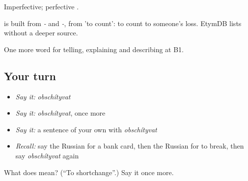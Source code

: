 Imperfective; perfective \emph{}.

\begin{cousinweb}
\emph{} is built from \emph{-} and \emph{-}, from \emph{} 'to count': to count to someone's loss. EtymDB lists \emph{} without a deeper source.
\end{cousinweb}

\begin{grammarlens}[title={What you've built}]
One more word for telling, explaining and describing at B1.
\end{grammarlens}

\subsection*{Your turn}
\begin{itemize}
\raggedright
  \item \emph{Say it:} \emph{obschítyvat}
  \item \emph{Say it:} \emph{obschítyvat}, once more
  \item \emph{Say it:} a sentence of your own with \emph{obschítyvat}
  \item \emph{Recall:} say the Russian for a bank card, then the Russian for to break, then say \emph{obschítyvat} again
\end{itemize}

\begin{tcolorbox}[breakable,colback=teal!4,colframe=teal!35!black,title={Before you move on}]
What does  mean? (\textquotedblleft{}To shortchange\textquotedblright{}.) Say it once more.
\end{tcolorbox}
